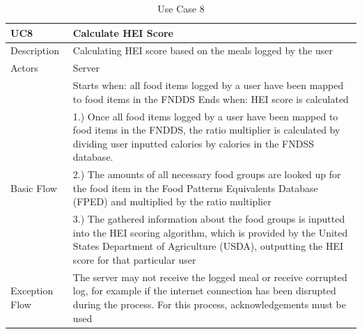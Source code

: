 \documentclass{article}
\begin{document}
\begin{appendicies}
\begin{table}[!htbp]
\centering
\hspace*{-0.5cm}
\begin{tabular}{||m{6cm}|m{6cm}||}
    \hline
    UC8 & Calculate HEI Score\\
    \hline
    Description & Calculating HEI score based on the meals logged by the user\\
    \hline
    Actors & Server\\
    \hline
    & Starts when: all food items logged by a user have been mapped to food items in the FNDDS\newline
    Ends when: HEI score is calculated\\
    \hline
    \multirow{3}{\hsize}{Basic Flow} 
                                    & 1.) Once all food items logged by a user have been mapped to food items in the FNDDS, the ratio multiplier is calculated by dividing user inputted calories by calories in the FNDSS database.\\
                                    & 2.) The amounts of all necessary food groups are looked up for the food item in the Food Patterns Equivalents Database (FPED) and multiplied by the ratio multiplier\\
                                    & 3.) The gathered information about the food groups is inputted into the HEI scoring algorithm, which is provided by the United States Department of Agriculture (USDA), outputting the HEI score for that particular user\\
    \hline
    Exception Flow & The server may not receive the logged meal or receive corrupted log, for example if the internet connection has been disrupted during the process. For this process, acknowledgements must be used\\
\hline
\end{tabular}
\caption{Use Case 8}
\label{table:UC8}
\end{table}


\end{appendicies}
\end{document}
